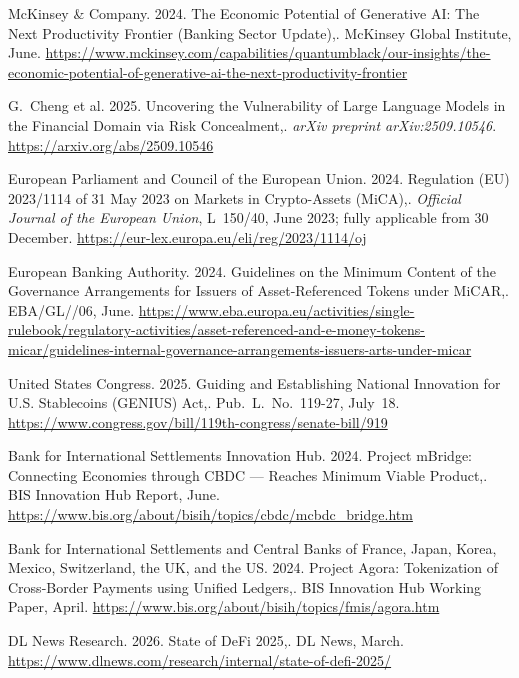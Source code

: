 {\begin{enumerate}[label={[\arabic*]}]
\item McKinsey \& Company. 2024. The Economic Potential of Generative AI: The Next Productivity Frontier (Banking Sector Update),. McKinsey Global Institute, June. \url{https://www.mckinsey.com/capabilities/quantumblack/our-insights/the-economic-potential-of-generative-ai-the-next-productivity-frontier}

\item G.~Cheng et al. 2025. Uncovering the Vulnerability of Large Language Models in the Financial Domain via Risk Concealment,. \emph{arXiv preprint arXiv:2509.10546}. \url{https://arxiv.org/abs/2509.10546}

\item European Parliament and Council of the European Union. 2024. Regulation (EU) 2023/1114 of 31 May 2023 on Markets in Crypto-Assets (MiCA),. \emph{Official Journal of the European Union}, L~150/40, June 2023; fully applicable from 30 December. \url{https://eur-lex.europa.eu/eli/reg/2023/1114/oj}

\item European Banking Authority. 2024. Guidelines on the Minimum Content of the Governance Arrangements for Issuers of Asset-Referenced Tokens under MiCAR,. EBA/GL//06, June. \url{https://www.eba.europa.eu/activities/single-rulebook/regulatory-activities/asset-referenced-and-e-money-tokens-micar/guidelines-internal-governance-arrangements-issuers-arts-under-micar}

\item United States Congress. 2025. Guiding and Establishing National Innovation for U.S. Stablecoins (GENIUS) Act,. Pub.~L.~No.~119-27, July~18. \url{https://www.congress.gov/bill/119th-congress/senate-bill/919}

\item Bank for International Settlements Innovation Hub. 2024. Project mBridge: Connecting Economies through CBDC --- Reaches Minimum Viable Product,. BIS Innovation Hub Report, June. \url{https://www.bis.org/about/bisih/topics/cbdc/mcbdc_bridge.htm}

\item Bank for International Settlements and Central Banks of France, Japan, Korea, Mexico, Switzerland, the UK, and the US. 2024. Project Agora: Tokenization of Cross-Border Payments using Unified Ledgers,. BIS Innovation Hub Working Paper, April. \url{https://www.bis.org/about/bisih/topics/fmis/agora.htm}

\item DL News Research. 2026. State of DeFi 2025,. DL News, March. \url{https://www.dlnews.com/research/internal/state-of-defi-2025/}


\end{enumerate}}
